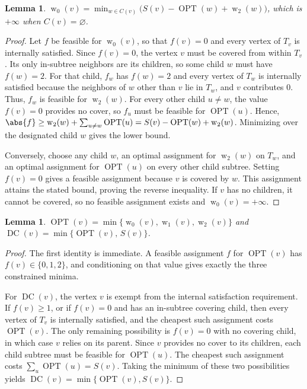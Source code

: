 \documentclass[11pt, a4paper]{article}
\newcommand{\OPT}{\operatorname{OPT}}
\newcommand{\DC}{\operatorname{DC}}
\newcommand{\with}[1]{\operatorname{w}_{#1}}  %
\newcommand{\Tv}{T_{v}}
\theoremstyle{plain}
\newtheorem{lemma}[theorem]{Lemma}
\theoremstyle{definition}
\begin{document}
\begin{lemma}\label{lem:w0}
$\with{0}(v) = \min_{w \in C(v)} \big( S(v) - \OPT(w) + \with{2}(w) \big)$, which
is $+\infty$ when $C(v) = \varnothing$.
\end{lemma}
\begin{proof}
Let $f$ be feasible for $\with{0}(v)$, so that $f(v) = 0$ and every vertex of
$\Tv$ is internally satisfied. Since $f(v) = 0$, the vertex $v$ must be covered
from within $\Tv$. Its only in-subtree neighbors are its children, so some child
$w$ must have $f(w) = 2$. For that child, $f_w$ has $f(w) = 2$ and every vertex of
$T_w$ is internally satisfied because the neighbors of $w$ other than $v$ lie in
$T_w$, and $v$ contributes $0$. Thus, $f_w$ is feasible for $\with{2}(w)$. For
every other child $u \neq w$, the value $f(v) = 0$ provides no cover, so $f_u$
must be feasible for $\OPT(u)$. Hence,
$\abs{f} \ge \with{2}(w) + \sum_{u \neq w}\OPT(u) = S(v) - \OPT(w) + \with{2}(w)$.
Minimizing over the designated child $w$ gives the lower bound.

Conversely, choose any child $w$, an optimal assignment for $\with{2}(w)$ on
$T_w$, and an optimal assignment for $\OPT(u)$ on every other child subtree.
Setting $f(v) = 0$ gives a feasible assignment because $v$ is covered by $w$. This
assignment attains the stated bound, proving the reverse inequality. If $v$ has no
children, it cannot be covered, so no feasible assignment exists and
$\with{0}(v) = +\infty$.
\end{proof}

\begin{lemma}\label{lem:optdc}
$\OPT(v) = \min\{\with{0}(v),\with{1}(v),\with{2}(v)\}$ and
$\DC(v) = \min\{\OPT(v),\, S(v)\}$.
\end{lemma}
\begin{proof}
The first identity is immediate. A feasible assignment $f$ for $\OPT(v)$ has
$f(v) \in \{0, 1, 2\}$, and conditioning on that value gives exactly the three
constrained minima.

For $\DC(v)$, the vertex $v$ is exempt from the internal satisfaction
requirement. If $f(v) \ge 1$, or if $f(v) = 0$ and has an in-subtree covering
child, then every vertex of $\Tv$ is internally satisfied, and the cheapest such
assignment costs $\OPT(v)$. The only remaining possibility is $f(v) = 0$ with no
covering child, in which case $v$ relies on its parent. Since $v$ provides no
cover to its children, each child subtree must be feasible for $\OPT(u)$. The
cheapest such assignment costs $\sum_u \OPT(u) = S(v)$. Taking the minimum of
these two possibilities yields $\DC(v) = \min\{\OPT(v), S(v)\}$.
\end{proof}
\end{document}
